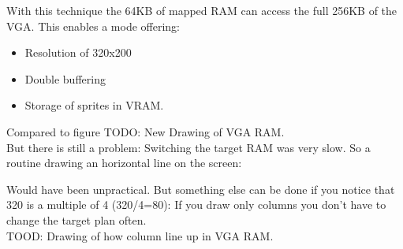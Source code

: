 \documentclass[book.tex]{subfiles}
\begin{document}

\par
With this technique the 64KB of mapped RAM can access the full 256KB of the VGA. This enables a mode offering:
\begin{itemize}
  \item Resolution of 320x200
  \item Double buffering
  \item Storage of sprites in VRAM.
\end{itemize}

Compared to figure 
TODO: New Drawing of VGA RAM.\\
But there is still a problem: Switching the target RAM was very slow. So a routine drawing an horizontal line on the screen:\\
\par
\begin{minipage}{\textwidth}

\end{minipage}
Would have been unpractical. But something else can be done if you notice that 320 is a multiple of 4 (320/4=80): If you draw only columns you don't have to change the target plan often.\\
TOOD: Drawing of how column line up in VGA RAM.\\

 \par
\end{document}
